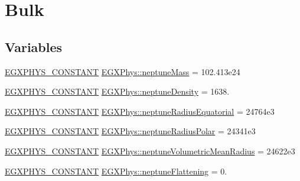 \hypertarget{group___e_g_x_phys-_constants-_astrophysics-_solar_system-_neptune-_bulk}{}\section{Bulk}
\label{group___e_g_x_phys-_constants-_astrophysics-_solar_system-_neptune-_bulk}
\subsection*{Variables}
\begin{DoxyCompactItemize}
\item 
\mbox{\hyperlink{group___e_g_x_phys-_constants-_macros_ga76980d288494ce1714c9ac68a95ba702}{E\+G\+X\+P\+H\+Y\+S\+\_\+\+C\+O\+N\+S\+T\+A\+NT}} \mbox{\hyperlink{group___e_g_x_phys-_constants-_astrophysics-_solar_system-_neptune-_bulk_gab142e8ab6de08f634c159a0fe1f4a653}{E\+G\+X\+Phys\+::neptune\+Mass}} = 102.\+413e24
\item 
\mbox{\hyperlink{group___e_g_x_phys-_constants-_macros_ga76980d288494ce1714c9ac68a95ba702}{E\+G\+X\+P\+H\+Y\+S\+\_\+\+C\+O\+N\+S\+T\+A\+NT}} \mbox{\hyperlink{group___e_g_x_phys-_constants-_astrophysics-_solar_system-_neptune-_bulk_ga17739a846a91af160e948129d93cefe9}{E\+G\+X\+Phys\+::neptune\+Density}} = 1638.
\item 
\mbox{\hyperlink{group___e_g_x_phys-_constants-_macros_ga76980d288494ce1714c9ac68a95ba702}{E\+G\+X\+P\+H\+Y\+S\+\_\+\+C\+O\+N\+S\+T\+A\+NT}} \mbox{\hyperlink{group___e_g_x_phys-_constants-_astrophysics-_solar_system-_neptune-_bulk_ga2060841ebac89fa7672b789d14ed02a3}{E\+G\+X\+Phys\+::neptune\+Radius\+Equatorial}} = 24764e3
\item 
\mbox{\hyperlink{group___e_g_x_phys-_constants-_macros_ga76980d288494ce1714c9ac68a95ba702}{E\+G\+X\+P\+H\+Y\+S\+\_\+\+C\+O\+N\+S\+T\+A\+NT}} \mbox{\hyperlink{group___e_g_x_phys-_constants-_astrophysics-_solar_system-_neptune-_bulk_gacf77a3d2ab4e31942c751c2d27d7c13d}{E\+G\+X\+Phys\+::neptune\+Radius\+Polar}} = 24341e3
\item 
\mbox{\hyperlink{group___e_g_x_phys-_constants-_macros_ga76980d288494ce1714c9ac68a95ba702}{E\+G\+X\+P\+H\+Y\+S\+\_\+\+C\+O\+N\+S\+T\+A\+NT}} \mbox{\hyperlink{group___e_g_x_phys-_constants-_astrophysics-_solar_system-_neptune-_bulk_ga84491897c938da2ce4cfa09326fc8899}{E\+G\+X\+Phys\+::neptune\+Volumetric\+Mean\+Radius}} = 24622e3
\item 
\mbox{\hyperlink{group___e_g_x_phys-_constants-_macros_ga76980d288494ce1714c9ac68a95ba702}{E\+G\+X\+P\+H\+Y\+S\+\_\+\+C\+O\+N\+S\+T\+A\+NT}} \mbox{\hyperlink{group___e_g_x_phys-_constants-_astrophysics-_solar_system-_neptune-_bulk_ga07b9e82e448a3684fe75dd7f5ef07fc0}{E\+G\+X\+Phys\+::neptune\+Flattening}} = 0.

\end{DoxyCompactItemize}
